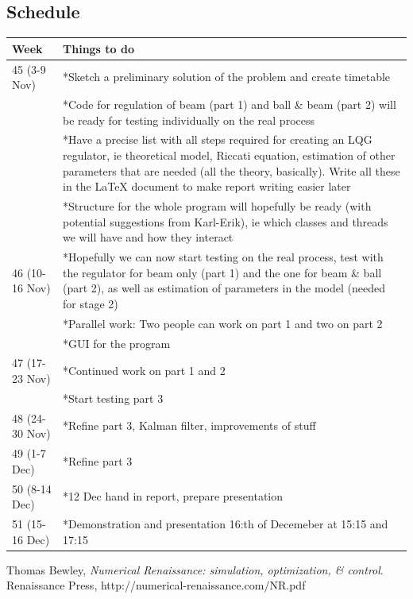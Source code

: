 \documentclass{article}
\begin{document}
\subsection{Schedule}
\begin{tabular}[h]{|l|p{10cm}|}
\hline
Week & Things to do \\ \hline
45 (3-9 Nov) & *Sketch a preliminary solution of the problem and create timetable \\
 & *Code for regulation of beam (part 1) and ball \& beam (part 2) will be ready for testing individually on the real process  \\
 & *Have a precise list with all steps required for creating an LQG regulator, ie theoretical model, Riccati equation, estimation of other parameters that are needed (all the theory, basically). Write all these in the LaTeX document to make report writing easier later \\
 & *Structure for the whole program will hopefully be ready (with potential suggestions from Karl-Erik), ie which classes and threads we will have and how they interact \\
\hline
46 (10-16 Nov) & *Hopefully we can now start testing on the real process, test with the regulator for beam only (part 1) and the one for beam \& ball (part 2), as well as estimation of parameters in the model (needed for stage 2) \\
 & *Parallel work: Two people can work on part 1 and two on part 2 \\
 & *GUI for the program \\
\hline
47 (17-23 Nov) & *Continued work on part 1 and 2 \\
 & *Start testing part 3 \\
\hline
48 (24-30 Nov) & *Refine part 3, Kalman filter, improvements of stuff \\
\hline
49 (1-7 Dec) & *Refine part 3 \\
\hline
50 (8-14 Dec) & *12 Dec hand in report, prepare presentation \\
\hline
51 (15-16 Dec) & *Demonstration and presentation 16:th of Decemeber at 15:15 and 17:15 \\
\hline

\end{tabular}

\newpage
\begin{thebibliography}{9}
  Thomas Bewley,
  \emph{Numerical Renaissance: simulation, optimization, \& control}.
  Renaissance Press,
  http://numerical-renaissance.com/NR.pdf

\end{thebibliography}
\end{document}
